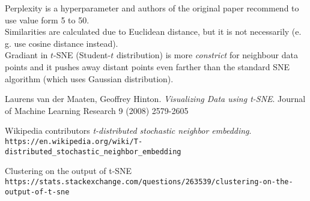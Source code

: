 \documentclass[a4paper]{article}
\begin{document}
Perplexity is a hyperparameter and authors of the original paper recommend to use value form 5 to 50.\\

Similarities are calculated due to Euclidean distance, but it is not necessarily (e. g. use cosine distance instead).\\

Gradiant in $t$-SNE (Student-$t$ distribution) is more \textit{constrict} for neighbour data points and it pushes away distant points even farther than the standard SNE algorithm (which uses Gaussian distribution).\\


\begin{thebibliography}{4}
	Laurens van der Maaten, Geoffrey Hinton.
	\textit{Visualizing Data using t-SNE}. 
	Journal of Machine Learning Research 9 (2008) 2579-2605
	
	Wikipedia contributors
	\textit{t-distributed stochastic neighbor embedding}. 
	\\\texttt{https://en.wikipedia.org/wiki/T-distributed\_stochastic\_neighbor\_embedding}
	
	Clustering on the output of t-SNE
	\\\texttt{https://stats.stackexchange.com/questions/263539/clustering-on-the-output-of-t-sne}
	
\end{thebibliography}
\end{document}
